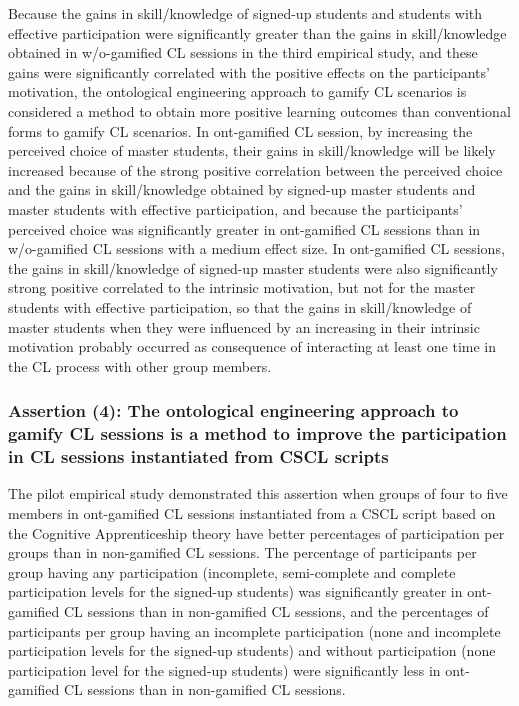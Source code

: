 Because the gains in skill/knowledge of signed-up students and students with effective participation were significantly greater than the gains in skill/knowledge obtained in w/o-gamified CL sessions in the third empirical study, and these gains were significantly correlated with the positive effects on the participants' motivation, the ontological engineering approach to gamify CL scenarios is considered a method to obtain more positive learning outcomes than conventional forms to gamify CL scenarios.
In ont-gamified CL session, by increasing the perceived choice of master students, their gains in skill/knowledge will be likely increased because of the strong positive correlation between the perceived choice and the gains in skill/knowledge obtained by signed-up master students and master students with effective participation, and because the participants' perceived choice was significantly greater in ont-gamified CL sessions than in w/o-gamified CL sessions with a medium effect size.
In ont-gamified CL sessions, the gains in skill/knowledge of signed-up master students were also significantly strong positive correlated to the intrinsic motivation, but not for the master students with effective participation, so that the gains in skill/knowledge of master students when they were influenced by an increasing in their intrinsic motivation probably occurred as consequence of interacting at least one time in the CL process with other group members.

\subsubsection*{Assertion (4): The ontological engineering approach to gamify CL sessions is a method to improve the participation in CL sessions instantiated from CSCL scripts}

The pilot empirical study demonstrated this assertion when groups of four to five members in ont-gamified CL sessions instantiated from a CSCL script based on the Cognitive Apprenticeship theory have better percentages of participation per groups than in non-gamified CL sessions.
The percentage of participants per group having any participation (incomplete, semi-complete and complete participation levels for the signed-up students) was significantly greater in ont-gamified CL sessions than in non-gamified CL sessions, and the percentages of participants per group having an incomplete participation (none and incomplete participation levels for the signed-up students) and without participation (none participation level for the signed-up students) were significantly less in ont-gamified CL sessions than in non-gamified CL sessions.


